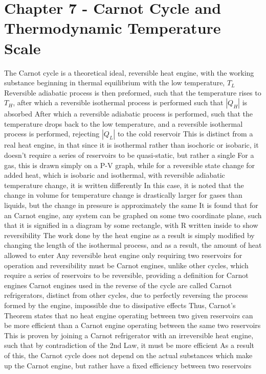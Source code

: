 \section{Chapter 7 - Carnot Cycle and Thermodynamic Temperature Scale}
\begin{outline*}
\1 The Carnot cycle is a theoretical ideal, reversible heat engine, with the working substance beginning in thermal equilibrium with the low temperature, $T_L$
\2 Reversible adiabatic process is then preformed, such that the temperature rises to $T_H$, after which a reversible isothermal process is performed such that $|Q_H|$ is absorbed
\2 After which a reversible adiabatic process is performed, such that the temperature drops back to the low temperature, and a reversible isothermal process is performed, rejecting $|Q_L|$ to the cold reservoir
\2 This is distinct from a real heat engine, in that since it is isothermal rather than isochoric or isobaric, it doesn't require a series of reservoirs to be quasi-static, but rather a single
\1 For a gas, this is drawn simply on a P-V graph, while for a reversible state change for added heat, which is isobaric and isothermal, with reversible adiabatic temperature change, it is written differently
\2 In this case, it is noted that the change in volume for temperature change is drastically larger for gases than liquids, but the change in pressure is approximately the same
\3 It is found that for an Carnot engine, any system can be graphed on some two coordinate plane, such that it is signified in a diagram by some rectangle, with R written inside to show reversibility
\2 The work done by the heat engine as a result is simply modified by changing the length of the isothermal process, and as a result, the amount of heat allowed to enter
\1 Any reversible heat engine only requiring two reservoirs for operation and reversibility must be Carnot engines, unlike other cycles, which require a series of reservoirs to be reversible, providing a definition for Carnot engines
\2 Carnot engines used in the reverse of the cycle are called Carnot refrigerators, distinct from other cycles, due to perfectly reversing the process formed by the engine, impossible due to dissipative effects
\2 Thus, Carnot's Theorem states that no heat engine operating between two given reservoirs can be more efficient than a Carnot engine operating between the same two reservoirs
\3 This is proven by joining a Carnot refrigerator with an irreversible heat engine, such that by contradiction of the 2nd Law, it must be more efficient
\3 As a result of this, the Carnot cycle does not depend on the actual substances which make up the Carnot engine, but rather have a fixed efficiency between two reservoirs

\end{outline*}
